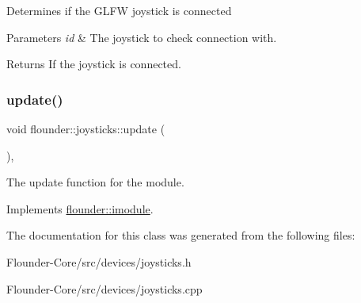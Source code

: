 Determines if the G\+L\+FW joystick is connected 


\begin{DoxyParams}{Parameters}
{\em id} & The joystick to check connection with. \\
\hline
\end{DoxyParams}
\begin{DoxyReturn}{Returns}
If the joystick is connected. 
\end{DoxyReturn}
\mbox{\label{classflounder_1_1joysticks_a346fc03cae7164d6eb927333d1ae725f}} 
\subsubsection{\texorpdfstring{update()}{update()}}
{\footnotesize\ttfamily void flounder\+::joysticks\+::update (\begin{DoxyParamCaption}{ }\end{DoxyParamCaption})\hspace{0.3cm}{\ttfamily [override]}, {\ttfamily [virtual]}}



The update function for the module. 



Implements \hyperlink{classflounder_1_1imodule_a9a53d48a46b5f6b16a92b2cd8503f74a}{flounder\+::imodule}.



The documentation for this class was generated from the following files\+:\begin{DoxyCompactItemize}
\item 
Flounder-\/\+Core/src/devices/joysticks.\+h\item 
Flounder-\/\+Core/src/devices/joysticks.\+cpp\end{DoxyCompactItemize}
